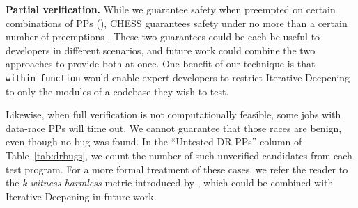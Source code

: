 
{\bf Partial verification.}
While we guarantee safety when preempted on certain combinations of PPs (\sect{\ref{sec:eval-sssmc}}),
CHESS
guarantees safety under no more than a certain number of preemptions \cite{chess-icb}.
These two guarantees could be each be useful to developers in different scenarios,
and future work could combine the two approaches to provide both at once.
One benefit of our technique is that {\tt within\_function} %
would enable expert developers to
restrict Iterative Deepening to only the modules of a codebase they wish to test.

Likewise, when full verification is not computationally feasible,
some jobs with data-race PPs will time out.
We cannot guarantee that those races are
benign, even though no bug was found.
In the ``Untested DR PPs'' column of Table~\ref{tab:drbugs}, we count the number of such unverified candidates from each test program.
For a more formal treatment of these cases, we refer the reader to the {\em k-witness harmless} metric introduced by \cite{portend},
which could be combined with Iterative Deepening in future work.

